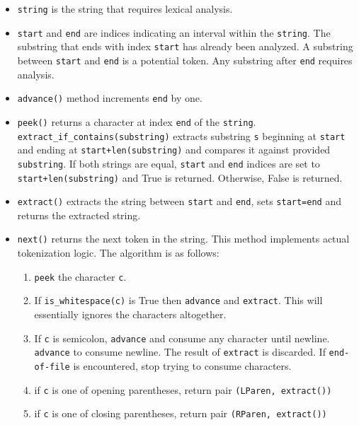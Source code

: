 \begin{itemize}
\item
\texttt{string} is the string that requires lexical analysis.

\item
\texttt{start} and \texttt{end} are indices indicating an interval within the \texttt{string}. The substring that ends with index \texttt{start} has already been analyzed. A substring between \texttt{start} and \texttt{end} is a potential token. Any substring after \texttt{end} requires analysis.

\item
\texttt{advance()} method increments \texttt{end} by one.

\item
\texttt{peek()} returns a character at index \texttt{end} of the \texttt{string}.
\texttt{extract\_if\_contains(substring)} extracts substring \texttt{s} beginning at \texttt{start} and ending at \texttt{start+len(substring)} and compares it against provided \texttt{substring}. If both strings are equal, \texttt{start} and \texttt{end} indices are set to \texttt{start+len(substring)} and True is returned. Otherwise, False is returned.

\item
\texttt{extract()} extracts the string between \texttt{start} and \texttt{end}, sets \texttt{start=end} and returns the extracted string.

\item
\texttt{next()} returns the next token in the string. This method implements actual tokenization logic. The algorithm is as follows:
\begin{enumerate}
	\item
	\texttt{peek} the character \texttt{c}.
	
	\item
	If \texttt{is\_whitespace(c)} is True then \texttt{advance} and \texttt{extract}. This will essentially ignores the characters altogether.

	\item
	If \texttt{c} is semicolon, \texttt{advance} and consume any character until newline. \texttt{advance} to consume newline. The result of \texttt{extract} is discarded. If \texttt{end-of-file} is encountered, stop trying to consume characters.

	\item
	if \texttt{c} is one of opening parentheses, return pair \texttt{(LParen, extract())}

	\item
	if \texttt{c} is one of closing parentheses, return pair \texttt{(RParen, extract())}


\end{enumerate}
\end{itemize}
